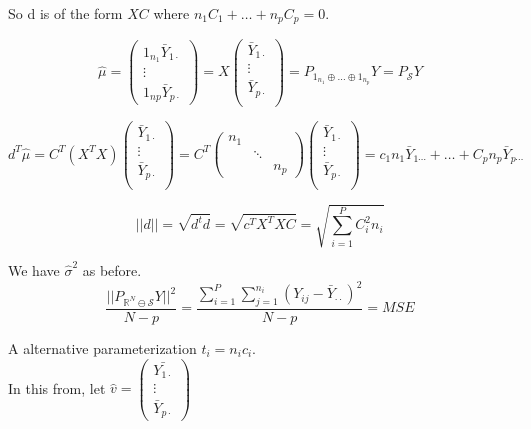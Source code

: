 \documentclass[11pt,fleqn]{book} %
\begin{document}
So d is of the form $XC$ where $n_1C_1 + \dots + n_p C_p = 0$. 

		$$ \hat{\mu} = \begin{pmatrix}
			1_{n_1} \bar{Y}_{1\cdot}\\
			\vdots\\
			1_{np} \bar{Y}_{p \cdot}
		\end{pmatrix} = X \begin{pmatrix}
			\bar{Y}_{1\cdot}\\
			\vdots\\
			\bar{Y}_{p \cdot}\\
		\end{pmatrix} = P _{1_{n_1} \oplus \dots \oplus 1_{n_p} } Y = P_{\mathcal{S}} Y$$

		$$d^T \hat{\mu} = C^T (X^T X)  \begin{pmatrix}
			\bar{Y}_{1\cdot}\\
			\vdots\\
			\bar{Y}_{p \cdot}\\
		\end{pmatrix} = C^T \begin{pmatrix}
			n_1 & & \\
			& \ddots & \\
			& & n_p
		\end{pmatrix} \begin{pmatrix}
			\bar{Y}_{1\cdot}\\
			\vdots\\
			\bar{Y}_{p \cdot}\\
		\end{pmatrix} = c_1n_1 \bar{Y}_{1\cdots} + \dots + C_p n_p \bar{Y}_{p \cdots} $$


		$$||d|| = \sqrt{d^t d} = \sqrt{c^T X^T X C } = \sqrt{\sum^P_{i = 1} C_i^2 n_i} $$


We have $\hat{\sigma}^2$ as before. \\

		$$\frac{||P_{\mathbb{R}^N \ominus \mathcal{S}} Y ||^2}{N - p} = \frac{\displaystyle \sum^P_{i = 1} \sum^{n_i}_{j=1} (Y_{ij} - \bar{Y}_{\cdot \cdot})^2}{N- p} = MSE $$


A alternative parameterization $t_i = n_i c_i$.\\


In this from, let $\hat{v} = \begin{pmatrix}
	\bar{Y_{1 \cdot}} \\
	\vdots \\
	\bar{Y}_{p \cdot}
\end{pmatrix}$\\
\end{document}
